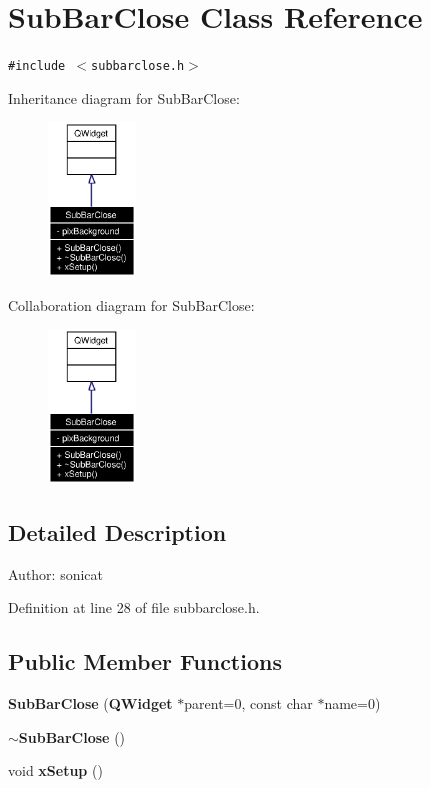 \section{Sub\-Bar\-Close Class Reference}
\label{classSubBarClose}
{\tt \#include $<$subbarclose.h$>$}

Inheritance diagram for Sub\-Bar\-Close:\begin{figure}[H]
\begin{center}
\leavevmode
\includegraphics[width=66pt]{classSubBarClose__inherit__graph}
\end{center}
\end{figure}
Collaboration diagram for Sub\-Bar\-Close:\begin{figure}[H]
\begin{center}
\leavevmode
\includegraphics[width=66pt]{classSubBarClose__coll__graph}
\end{center}
\end{figure}


\subsection{Detailed Description}
\begin{Desc}
\item[Author:]sonicat \end{Desc}




Definition at line 28 of file subbarclose.h.\subsection*{Public Member Functions}
\begin{CompactItemize}
\item 
{\bf Sub\-Bar\-Close} ({\bf QWidget} $\ast$parent=0, const char $\ast$name=0)
\item 
{\bf $\sim$Sub\-Bar\-Close} ()
\item 
void {\bf x\-Setup} ()
\end{CompactItemize}
